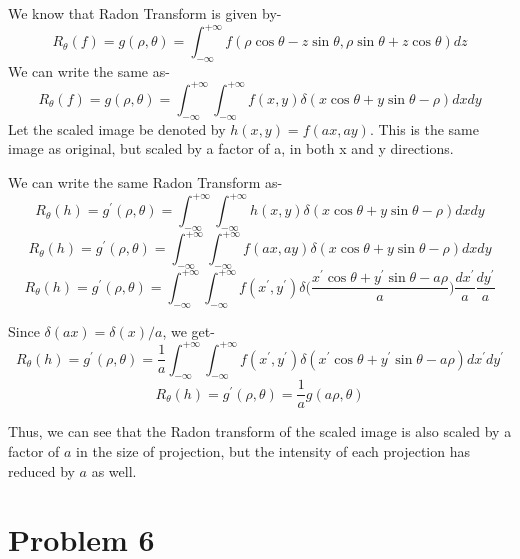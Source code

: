 \documentclass[a4paper,11pt]{article}
\numberwithin{definition}{section}
\numberwithin{mytheorem}{subsection}
\begin{document}
We know that Radon Transform is given by-
$$R_\theta(f) =g(\rho, \theta)= \int_{-\infty}^{+\infty}f(\rho\cos\theta - z\sin\theta,\rho\sin \theta + z\cos\theta)dz $$
We can write the same as-
$$R_\theta(f) =g(\rho, \theta)= \int_{-\infty}^{+\infty}\int_{-\infty}^{+\infty}f(x,y)\delta(x\cos\theta+y\sin\theta -\rho)dxdy $$
Let the scaled image be denoted by $h(x,y) = f(ax, ay)$. This is the same image as original, but scaled by a factor of a, in both x and y directions.

We can write the same Radon Transform as-
$$ R_\theta(h) =g^{\prime}(\rho, \theta)= \int_{-\infty}^{+\infty}\int_{-\infty}^{+\infty}h(x,y)\delta(x\cos\theta+y\sin\theta -\rho)dxdy $$
$$ R_\theta(h) =g^{\prime}(\rho, \theta)= \int_{-\infty}^{+\infty}\int_{-\infty}^{+\infty}f(ax,ay)\delta(x\cos\theta+y\sin\theta -\rho)dxdy $$
$$ R_\theta(h) =g^{\prime}(\rho, \theta)= \int_{-\infty}^{+\infty}\int_{-\infty}^{+\infty}f(x^{\prime},y^{\prime})\delta\bigg(\frac{x^{\prime}\cos\theta+y^{\prime}\sin\theta -a\rho}{a}\bigg)\frac{dx^{\prime}}{a}\frac{dy^{\prime}}{a} $$

Since $\delta(ax) = \delta(x)/a$, we get-
$$ R_\theta(h) =g^{\prime}(\rho, \theta)= \frac{1}{a}\int_{-\infty}^{+\infty}\int_{-\infty}^{+\infty}f(x^{\prime},y^{\prime})\delta(x^{\prime}\cos\theta+y^{\prime}\sin\theta -a\rho)dx^{\prime}dy^{\prime} $$
$$ R_\theta(h) =g^{\prime}(\rho, \theta)= \frac{1}{a}g(a\rho, \theta) $$

Thus, we can see that the Radon transform of the scaled image is also scaled by a factor of $a$ in the size of projection, but the intensity of each projection has reduced by $a$ as well.
 








\section{Problem 6}
\end{document}
